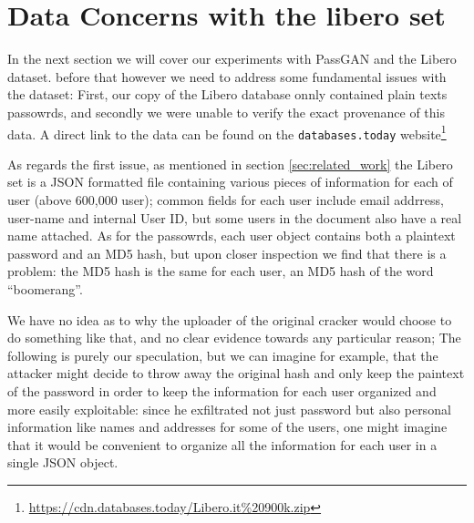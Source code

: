 \section{Data Concerns with the libero set}
In the next section we will cover our experiments with PassGAN and the Libero dataset.
before that however we need to address some fundamental issues with the dataset: First, our copy of the Libero database onnly contained plain texts passowrds, and secondly we were unable to verify the exact provenance of this data.
A direct link to the data can be found on the \texttt{databases.today} website\footnote{\url{https://cdn.databases.today/Libero.it\%20900k.zip}}

As regards the first issue, as mentioned in section \ref{sec:related_work} the Libero set is a JSON formatted file containing various pieces of information for each of user (above 600,000 user); common fields for each user include email addrress, user-name and internal User ID, but some users in the document also have a real name attached. As for the passowrds, each user object contains both a plaintext password and an MD5 hash, but upon closer inspection we find that there is a problem: the MD5 hash is the same for each user, an MD5 hash of the word \enquote{boomerang}.

We have no idea as to why the uploader of the original cracker would choose to do something like that, and no clear evidence towards any particular reason; The following is purely our speculation, but we can imagine for example, that the attacker might decide to throw away the original hash and only keep the paintext of the password in order to keep the information for each user organized and more easily exploitable: since he exfiltrated not just password but also personal information like names and addresses for some of the users, one might imagine that it would be convenient to organize all the information for each user in a single JSON object.

